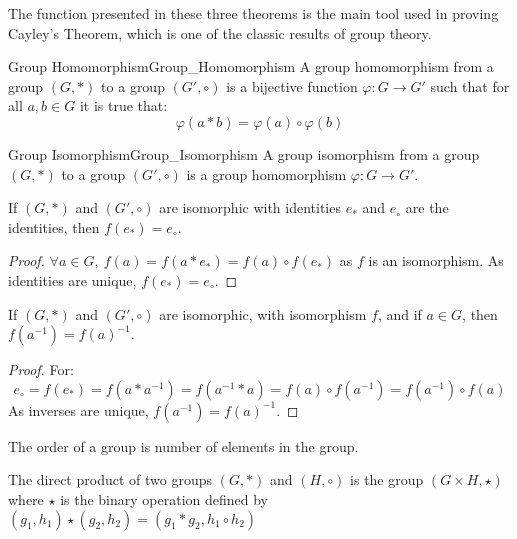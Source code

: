     The function presented in these three theorems is the main tool used in
    proving Cayley's Theorem, which is one of the
    classic results of group theory.
    \begin{fdefinition}{Group Homomorphism}{Group_Homomorphism}
        A \gls{group homomorphism} from a \gls{group} $(G,*)$ to a group
        $(G',\circ)$ is a \gls{bijective function} $\varphi:G\rightarrow{G}'$
        such that for all $a,b\in{G}$ it is true that:
        \begin{equation}
            \varphi(a*b)=\varphi(a)\circ\varphi(b)
        \end{equation}
    \end{fdefinition}
    \begin{fdefinition}{Group Isomorphism}{Group_Isomorphism}
        A \gls{group isomorphism} from a \gls{group} $(G,*)$ to a group
        $(G',\circ)$ is a 
        \gls{group homomorphism} $\varphi:G\rightarrow{G}'$.
    \end{fdefinition}
    \begin{theorem}
        If $(G,*)$ and $(G',\circ)$ are isomorphic with identities $e_{*}$
        and $e_{\circ}$ are the identities, then $f(e_{*})=e_{\circ}$.
    \end{theorem}
    \begin{proof}
        $\forall a\in G,\ f(a)=f(a* e_*) = f(a)\circ f(e_*)$ as $f$ is
        an isomorphism. As identities are unique, $f(e_*)=e_{\circ}$.
    \end{proof}
    \begin{theorem}
        If $(G,*)$ and $(G',\circ)$ are isomorphic, with isomorphism $f$, and if
        $a\in{G}$, then $f(a^{\minus{1}})=f(a)^{\minus{1}}$.
    \end{theorem}
    \begin{proof}
        For:
        \begin{equation}
            e_{\circ}=f(e_*)
                     =f(a*a^{-1})
                     =f(a^{-1}*a)
                     =f(a)\circ f(a^{-1})
                     =f(a^{-1})\circ f(a)
        \end{equation}
        As inverses are unique, $f(a^{-1})=f(a)^{-1}$.
    \end{proof}
    \begin{definition}
        The order of a group is number of elements in the
        group.
    \end{definition}
    \begin{definition}
        The direct product of two groups $(G,*)$ and
        $(H,\circ)$ is the group  $({G}\times{H},\star)$
        where $\star$ is the binary operation defined by
        $(g_{1},h_{1})\star(g_{2},h_{2})%
         =(g_{1}*g_{2},{h_{1}}\circ{h_{2}})$
    \end{definition}
